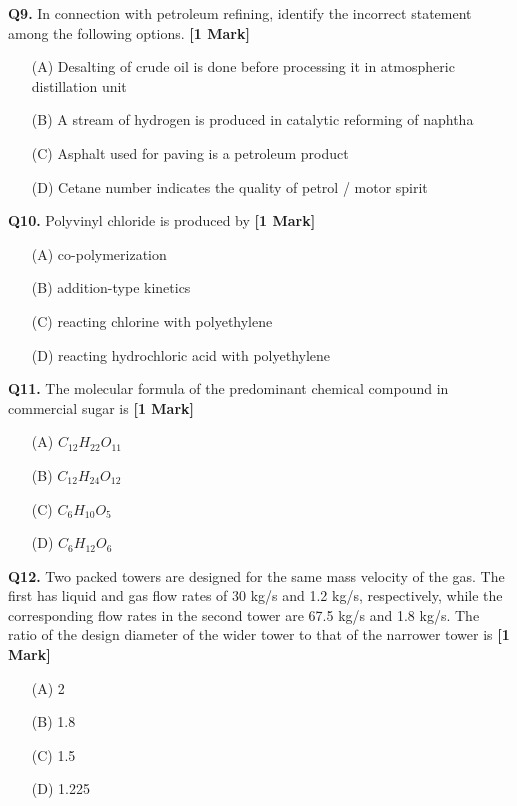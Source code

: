 \documentclass[11pt]{article}
\newcommand{\questiona}[2]{
    \noindent\textbf{Q#2.} #1 \hfill \textbf{[1 Mark]}
}
\begin{document}
\questiona{In connection with petroleum refining, identify the incorrect statement among the following options.}{9}
\begin{enumerate}
    \item[(A)] Desalting of crude oil is done before processing it in atmospheric distillation unit  
    \item[(B)] A stream of hydrogen is produced in catalytic reforming of naphtha  
    \item[(C)] Asphalt used for paving is a petroleum product  
    \item[(D)] Cetane number indicates the quality of petrol / motor spirit  
\end{enumerate}

\questiona{Polyvinyl chloride is produced by}{10}
\begin{enumerate}
    \item[(A)] co-polymerization  
    \item[(B)] addition-type kinetics  
    \item[(C)] reacting chlorine with polyethylene  
    \item[(D)] reacting hydrochloric acid with polyethylene  
\end{enumerate}

\questiona{The molecular formula of the predominant chemical compound in commercial sugar is}{11}
\begin{enumerate}
    \item[(A)] $C_{12}H_{22}O_{11}$  
    \item[(B)] $C_{12}H_{24}O_{12} $ 
    \item[(C)] $C_6H_{10}O_5 $ 
    \item[(D)] $C_6H_{12}O_6  $
\end{enumerate}

\questiona{Two packed towers are designed for the same mass velocity of the gas. The first has liquid and gas flow rates of 30 kg/s and 1.2 kg/s, respectively, while the corresponding flow rates in the second tower are 67.5 kg/s and 1.8 kg/s. The ratio of the design diameter of the wider tower to that of the narrower tower is}{12}
\begin{enumerate}
    \item[(A)] 2  
    \item[(B)] 1.8  
    \item[(C)] 1.5  
    \item[(D)] 1.225  
\end{enumerate}
\end{document}
